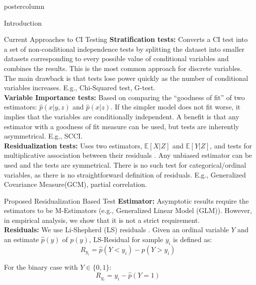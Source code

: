 \documentclass{beamer}
\begin{document}
\begin{frame}
\begin{columns}
\begin{column}{.33\textwidth}
\begin{beamercolorbox}[center]{postercolumn}
\begin{minipage}{.98\textwidth}
{\begin{myblock}{Introduction}
	\end{myblock}\vfill
	\begin{myblock}{Current Approaches to CI Testing}
		\justifying \textbf{Stratification tests:} Converts a CI
				test into a set of non-conditional independence
				tests by splitting the dataset into smaller
				datasets corresponding to every possible value
				of conditional variables and combines
				the results. This is the most common approach
				for discrete variables. The main drawback is
				that tests lose power quickly as the number
				of conditional variables increases. E.g.,
				Chi-Squared test, G-test. \\
				\vspace{0.8em}
		\justifying \textbf{Variable Importance tests:} Based
				on comparing the ``goodness of fit'' of two
				estimators: $ \hat{p}(x | y, z) $ and $
				\hat{p}(x|z) $. If the simpler model does not
				fit worse, it implies that the variables are
				conditionally independent. A benefit is that
				any estimator with a goodness of fit measure
				can be used, but tests are inherently
				asymmetrical. E.g., SCCI. \\
				\vspace{0.8em}
		\justifying \textbf{Residualization tests:} Uses two
				estimators, $ \mathbb{E}[X | Z] $ and $
				\mathbb{E}[Y|Z] $, and tests for multiplicative
				association between their residuals
				\cite{Daudin1980}. Any unbiased estimator can
				be used and the tests are symmetrical. There is
				no such test for categorical/ordinal variables,
				as there is no straightforward definition of
				residuals. E.g., Generalized Covariance
				Measure(GCM), partial correlation.
	\end{myblock}\vfill
	\begin{myblock}{Proposed Residualization Based Test}
		\justifying \textbf{Estimator:} Asymptotic results require
				the estimators to be M-Estimators (e.g.,
				Generalized Linear Model (GLM)). However, in
				empirical analysis, we show that it is not a
				strict requirement. \\
				\vspace{0.8em}
		\justifying \textbf{Residuals:} We use Li-Shepherd (LS) residuals \cite{li2012}.
				Given an ordinal variable $ Y $ and an estimate $ \hat{p}(y) $ of $
				p(y) $, LS-Residual for sample $ y_i $ is defined as:
				$$ R_{y_i} = \hat{p}(Y < y_i) - \hat{p}(Y > y_i) $$

				For the binary case with $ Y \in \{0, 1\} $:
				$$ R_{y_i} = y_i - \hat{p}(Y = 1) $$


\end{myblock}}
\end{minipage}
\end{beamercolorbox}
\end{column}
\end{columns}
\end{frame}
\end{document}

